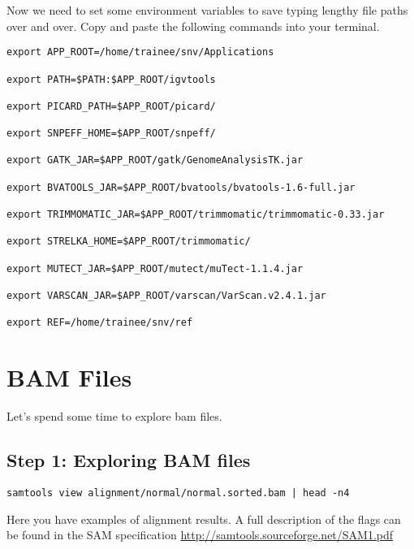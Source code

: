 \begin{steps}
Now we need to set some environment variables to save typing lengthy file paths over and over. Copy and paste the following commands into your terminal.
\begin{lstlisting}
export APP_ROOT=/home/trainee/snv/Applications

export PATH=$PATH:$APP_ROOT/igvtools

export PICARD_PATH=$APP_ROOT/picard/

export SNPEFF_HOME=$APP_ROOT/snpeff/

export GATK_JAR=$APP_ROOT/gatk/GenomeAnalysisTK.jar

export BVATOOLS_JAR=$APP_ROOT/bvatools/bvatools-1.6-full.jar

export TRIMMOMATIC_JAR=$APP_ROOT/trimmomatic/trimmomatic-0.33.jar

export STRELKA_HOME=$APP_ROOT/trimmomatic/

export MUTECT_JAR=$APP_ROOT/mutect/muTect-1.1.4.jar

export VARSCAN_JAR=$APP_ROOT/varscan/VarScan.v2.4.1.jar 

export REF=/home/trainee/snv/ref
\end{lstlisting}
\end{steps}




\section{BAM Files}

Let's spend some time to explore bam files.

\subsection{Step 1: Exploring BAM files}

\begin{steps}
\begin{lstlisting}
samtools view alignment/normal/normal.sorted.bam | head -n4
\end{lstlisting}
\end{steps}

Here you have examples of alignment results.
A full description of the flags can be found in the SAM specification
\url{http://samtools.sourceforge.net/SAM1.pdf}

